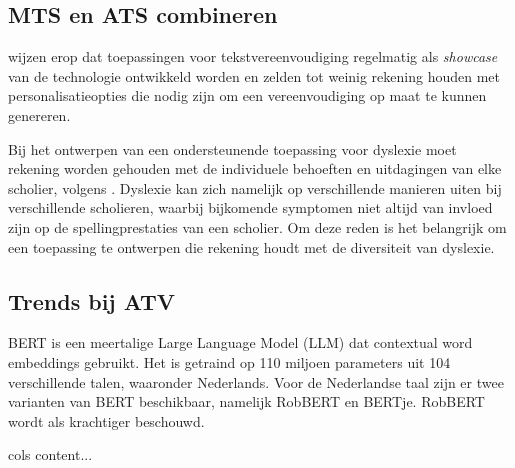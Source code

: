 \subsection{MTS en ATS combineren}

\textcite{Sanja2021} wijzen erop dat toepassingen voor tekstvereenvoudiging regelmatig als \textit{showcase} van de technologie ontwikkeld worden en zelden tot weinig rekening houden met personalisatieopties die nodig zijn om een vereenvoudiging op maat te kunnen genereren.

\medspace

Bij het ontwerpen van een ondersteunende toepassing voor dyslexie moet rekening worden gehouden met de individuele behoeften en uitdagingen van elke scholier, volgens \textcite{Gooding2022}. Dyslexie kan zich namelijk op verschillende manieren uiten bij verschillende scholieren, waarbij bijkomende symptomen niet altijd van invloed zijn op de spellingprestaties van een scholier. Om deze reden is het belangrijk om een toepassing te ontwerpen die rekening houdt met de diversiteit van dyslexie.

\subsection{Trends bij ATV}


BERT is een meertalige Large Language Model (LLM) dat contextual word embeddings gebruikt. Het is getraind op 110 miljoen parameters uit 104 verschillende talen, waaronder Nederlands. Voor de Nederlandse taal zijn er twee varianten van BERT beschikbaar, namelijk RobBERT en BERTje. RobBERT wordt als krachtiger beschouwd. 


\begin{tabular}{cols}
	content...
\end{tabular}




